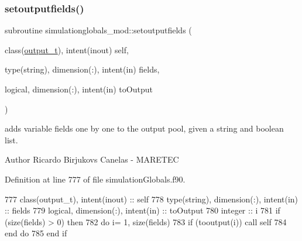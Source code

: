 \subsubsection{\texorpdfstring{setoutputfields()}{setoutputfields()}}
{\footnotesize\ttfamily subroutine simulationglobals\+\_\+mod\+::setoutputfields (\begin{DoxyParamCaption}\item[{class(\mbox{\hyperlink{structsimulationglobals__mod_1_1output__t}{output\+\_\+t}}), intent(inout)}]{self,  }\item[{type(string), dimension(\+:), intent(in)}]{fields,  }\item[{logical, dimension(\+:), intent(in)}]{to\+Output }\end{DoxyParamCaption})\hspace{0.3cm}{\ttfamily [private]}}



adds variable fields one by one to the output pool, given a string and boolean list. 

\begin{DoxyAuthor}{Author}
Ricardo Birjukovs Canelas -\/ M\+A\+R\+E\+T\+EC 
\end{DoxyAuthor}


Definition at line 777 of file simulation\+Globals.\+f90.


\begin{DoxyCode}
777     \textcolor{keywordtype}{class}(output\_t), \textcolor{keywordtype}{intent(inout)} :: self
778     \textcolor{keywordtype}{type}(string), \textcolor{keywordtype}{dimension(:)}, \textcolor{keywordtype}{intent(in)} :: fields
779     \textcolor{keywordtype}{logical}, \textcolor{keywordtype}{dimension(:)}, \textcolor{keywordtype}{intent(in)} :: toOutput
780     \textcolor{keywordtype}{integer} :: i
781     \textcolor{keywordflow}{if} (\textcolor{keyword}{size}(fields) > 0) \textcolor{keywordflow}{then}
782         \textcolor{keywordflow}{do} i= 1, \textcolor{keyword}{size}(fields)
783             \textcolor{keywordflow}{if} (tooutput(i)) \textcolor{keyword}{call }self%
784 \textcolor{keywordflow}{        end do}
785 \textcolor{keywordflow}{    end if}
\end{DoxyCode}
\mbox{\label{namespacesimulationglobals__mod_ada0b6ffc5e112afbd86cdaa8d9aa55d8}} 
